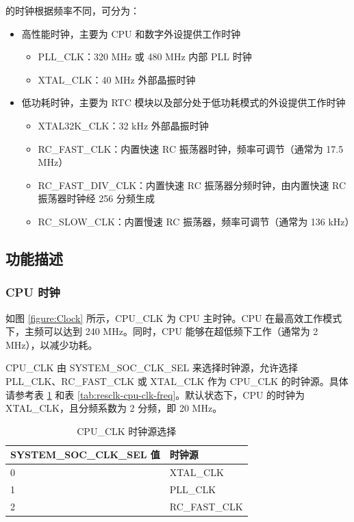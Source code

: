 \documentclass[main\_\_CN.tex]{subfiles}
\begin{document}
\chipname{} 的时钟根据频率不同，可分为：
\begin{itemize}
    \item 高性能时钟，主要为 CPU 和数字外设提供工作时钟
    \begin{itemize}
        \item PLL\_CLK：320 MHz 或 480 MHz 内部 PLL 时钟
        \item XTAL\_CLK：40 MHz 外部晶振时钟
    \end{itemize}
    \item 低功耗时钟，主要为 RTC 模块以及部分处于低功耗模式的外设提供工作时钟
    \begin{itemize}
        \item XTAL32K\_CLK：32 kHz 外部晶振时钟
	    \item RC\_FAST\_CLK：内置快速 RC 振荡器时钟，频率可调节（通常为 17.5 MHz）
	    \item RC\_FAST\_DIV\_CLK：内置快速 RC 振荡器分频时钟，由内置快速 RC 振荡器时钟经 256 分频生成
	    \item RC\_SLOW\_CLK：内置慢速 RC 振荡器，频率可调节（通常为 136 kHz）
    \end{itemize}
\end{itemize}


\subsection{功能描述}

\subsubsection{CPU 时钟}

如图 \ref{figure:Clock} 所示，CPU\_CLK 为 CPU 主时钟。CPU 在最高效工作模式下，主频可以达到 240 MHz。同时，CPU 能够在超低频下工作（通常为 2 MHz），以减少功耗。

CPU\_CLK 由 SYSTEM\_SOC\_CLK\_SEL 来选择时钟源，允许选择 PLL\_CLK、RC\_FAST\_CLK 或 XTAL\_CLK 作为 CPU\_CLK 的时钟源。具体请参考表 \ref{tab:resclk-cpu-clk-src} 和表 \ref{tab:resclk-cpu-clk-freq}。默认状态下，CPU 的时钟为 XTAL\_CLK，且分频系数为 2 分频，即 20 MHz。
\begin{longtable}[c]{|p{5cm}|p{5cm}| }
       \caption{CPU\_CLK 时钟源选择}
		\label{tab:resclk-cpu-clk-src} \\
	    \hline
        \rowcolor{lightgray}
        \textbf{SYSTEM\_SOC\_CLK\_SEL 值} & \textbf{时钟源} \\
        \hline
        0 & XTAL\_CLK \\
        \hline
        1 & PLL\_CLK \\
        \hline
        2 & RC\_FAST\_CLK \\
        \hline
\end{longtable}
\end{document}
